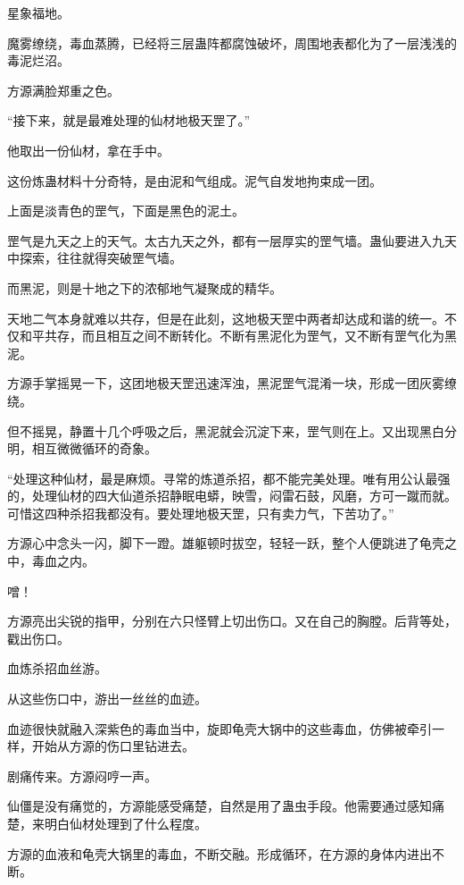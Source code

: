 
\begin{this_body}



星象福地。

魔雾缭绕，毒血蒸腾，已经将三层蛊阵都腐蚀破坏，周围地表都化为了一层浅浅的毒泥烂沼。

方源满脸郑重之色。

“接下来，就是最难处理的仙材地极天罡了。”

他取出一份仙材，拿在手中。

这份炼蛊材料十分奇特，是由泥和气组成。泥气自发地拘束成一团。

上面是淡青色的罡气，下面是黑色的泥土。

罡气是九天之上的天气。太古九天之外，都有一层厚实的罡气墙。蛊仙要进入九天中探索，往往就得突破罡气墙。

而黑泥，则是十地之下的浓郁地气凝聚成的精华。

天地二气本身就难以共存，但是在此刻，这地极天罡中两者却达成和谐的统一。不仅和平共存，而且相互之间不断转化。不断有黑泥化为罡气，又不断有罡气化为黑泥。

方源手掌摇晃一下，这团地极天罡迅速浑浊，黑泥罡气混淆一块，形成一团灰雾缭绕。

但不摇晃，静置十几个呼吸之后，黑泥就会沉淀下来，罡气则在上。又出现黑白分明，相互微微循环的奇象。

“处理这种仙材，最是麻烦。寻常的炼道杀招，都不能完美处理。唯有用公认最强的，处理仙材的四大仙道杀招静眠电蟒，映雪，闷雷石鼓，风磨，方可一蹴而就。可惜这四种杀招我都没有。要处理地极天罡，只有卖力气，下苦功了。”

方源心中念头一闪，脚下一蹬。雄躯顿时拔空，轻轻一跃，整个人便跳进了龟壳之中，毒血之内。

噌！

方源亮出尖锐的指甲，分别在六只怪臂上切出伤口。又在自己的胸膛。后背等处，戳出伤口。

血炼杀招血丝游。

从这些伤口中，游出一丝丝的血迹。

血迹很快就融入深紫色的毒血当中，旋即龟壳大锅中的这些毒血，仿佛被牵引一样，开始从方源的伤口里钻进去。

剧痛传来。方源闷哼一声。

仙僵是没有痛觉的，方源能感受痛楚，自然是用了蛊虫手段。他需要通过感知痛楚，来明白仙材处理到了什么程度。

方源的血液和龟壳大锅里的毒血，不断交融。形成循环，在方源的身体内进出不断。


\end{this_body}
